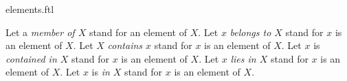 \documentclass{stex}
\begin{document}
\begin{smodule}{elements.ftl}


\begin{convention*}[forthel]
  Let a \emph{member of $X$} stand for an element of $X$.
  Let $x$ \emph{belongs to $X$} stand for $x$ is an element of $X$.
  Let $X$ \emph{contains $x$} stand for $x$ is an element of $X$.
  Let $x$ is \emph{contained in $X$} stand for $x$ is an element of $X$.
  Let $x$ \emph{lies in $X$} stand for $x$ is an element of $X$.
  Let $x$ is \emph{in $X$} stand for $x$ is an element of $X$.
\end{convention*}

\end{smodule}
\end{document}
